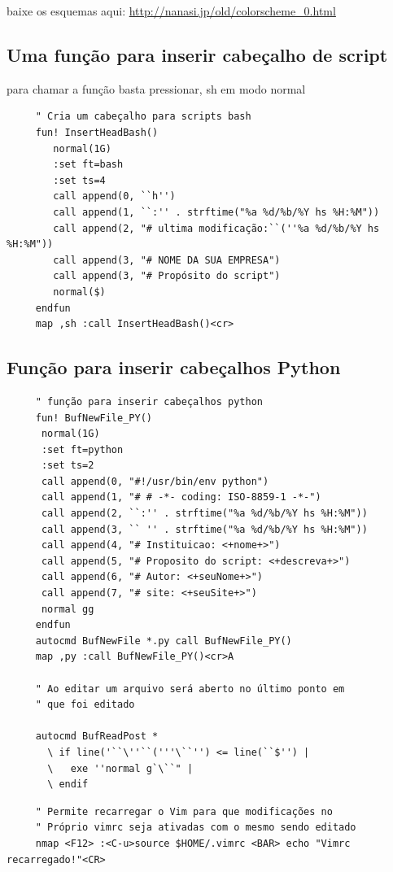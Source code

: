 \documentclass[10pt,a4paper,openany]{book}
\begin{document}
baixe os esquemas aqui:
\url{http://nanasi.jp/old/colorscheme_0.html}

\subsection{Uma função para inserir cabeçalho de script}
\label{Uma função para inserir cabeçalho de script bash}
para chamar a função
basta pressionar, sh em modo normal

\begin{verbatim}
     " Cria um cabeçalho para scripts bash
     fun! InsertHeadBash()
        normal(1G)
        :set ft=bash
        :set ts=4
        call append(0, ``h'')
        call append(1, ``:'' . strftime("%a %d/%b/%Y hs %H:%M"))
        call append(2, "# ultima modificação:``(''%a %d/%b/%Y hs %H:%M"))
        call append(3, "# NOME DA SUA EMPRESA")
        call append(3, "# Propósito do script")
        normal($)
     endfun
     map ,sh :call InsertHeadBash()<cr>
\end{verbatim}

\subsection{Função para inserir cabeçalhos Python}
\label{Função para inserir cabeçalhos python}

\begin{verbatim}
     " função para inserir cabeçalhos python
     fun! BufNewFile_PY()
      normal(1G)
      :set ft=python
      :set ts=2
      call append(0, "#!/usr/bin/env python")
      call append(1, "# # -*- coding: ISO-8859-1 -*-")
      call append(2, ``:'' . strftime("%a %d/%b/%Y hs %H:%M"))
      call append(3, `` '' . strftime("%a %d/%b/%Y hs %H:%M"))
      call append(4, "# Instituicao: <+nome+>")
      call append(5, "# Proposito do script: <+descreva+>")
      call append(6, "# Autor: <+seuNome+>")
      call append(7, "# site: <+seuSite+>")
      normal gg
     endfun
     autocmd BufNewFile *.py call BufNewFile_PY()
     map ,py :call BufNewFile_PY()<cr>A
   
     " Ao editar um arquivo será aberto no último ponto em
     " que foi editado
   
     autocmd BufReadPost *
       \ if line('``\''``('''\``'') <= line(``$'') |
       \   exe ''normal g`\``" |
       \ endif
\end{verbatim}

\begin{verbatim}
     " Permite recarregar o Vim para que modificações no
     " Próprio vimrc seja ativadas com o mesmo sendo editado
     nmap <F12> :<C-u>source $HOME/.vimrc <BAR> echo "Vimrc recarregado!"<CR>
\end{verbatim}
\end{document}
